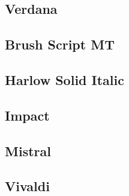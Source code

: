 \documentclass[a4paper,12pt]{article}
\begin{document}
\subsection*{Verdana}
\lipsum[1]

\subsection*{Brush Script MT}
\lipsum[1]

\subsection*{Harlow Solid Italic}
\lipsum[1]

\subsection*{Impact}
\lipsum[1]

\subsection*{Mistral}
\lipsum[1]


\subsection*{Vivaldi}
\lipsum[1]
\end{document}
